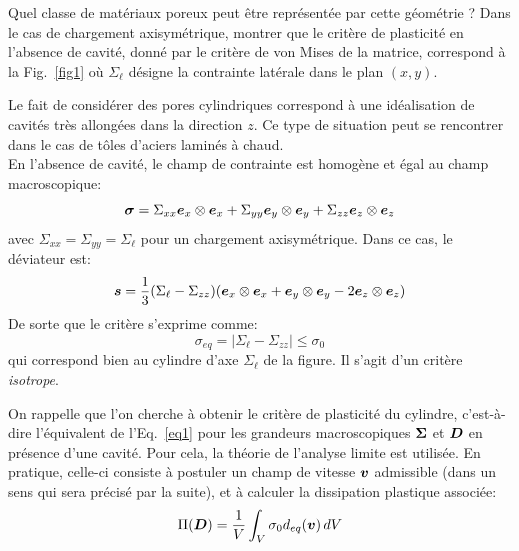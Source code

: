 \documentclass[french,12pt]{exam}
\begin{document}
\begin{questions}
\question Quel classe de matériaux poreux peut être représentée par cette géométrie ? Dans le cas de chargement axisymétrique, montrer que le critère de plasticité en l'absence de cavité, donné par le critère de von Mises de la matrice, correspond à la Fig.~\ref{fig1} où $\Sigma_\ell$ désigne la contrainte latérale dans le plan $(x,y)$.\\
\end{questions}

\begin{solution}
Le fait de considérer des pores cylindriques correspond à une idéalisation de cavités très allongées dans la direction $z$. Ce type de situation peut se rencontrer dans le cas de tôles d'aciers laminés à chaud.\\

En l'absence de cavité, le champ de contrainte est homogène et égal au champ macroscopique:
$$\boldsymbol{\sigma} = \Sigma_{xx}\boldsymbol{e}_x\otimes\boldsymbol{e}_x + \Sigma_{yy}\boldsymbol{e}_y\otimes\boldsymbol{e}_y +  \Sigma_{zz}\boldsymbol{e}_z\otimes\boldsymbol{e}_z$$
avec $\Sigma_{xx}=\Sigma_{yy}=\Sigma_\ell$ pour un chargement axisymétrique. Dans ce cas, le déviateur est:
$$\boldsymbol{s} = \dfrac{1}{3}(\Sigma_{\ell}-\Sigma_{zz})(\boldsymbol{e}_x\otimes\boldsymbol{e}_x + \boldsymbol{e}_y\otimes\boldsymbol{e}_y - 2\boldsymbol{e}_z\otimes\boldsymbol{e}_z)$$
De sorte que le critère s'exprime comme:
$$\sigma_{eq} = |\Sigma_\ell - \Sigma_{zz}| \leq \sigma_0$$
qui correspond bien au cylindre d'axe $\Sigma_{\ell}$ de la figure. Il s'agit d'un critère \textit{isotrope}.
\end{solution}

On rappelle que l'on cherche à obtenir le critère de plasticité du cylindre, c'est-à-dire l'équivalent de l'Eq.~\ref{eq1} pour les grandeurs macroscopiques $\boldsymbol{\Sigma}$ et $\boldsymbol{D}$ en présence d'une cavité. Pour cela, la théorie de l'analyse limite est utilisée. En pratique, celle-ci consiste à postuler un champ de vitesse $\boldsymbol{v}$ admissible (dans un sens qui sera précisé par la suite), et à calculer la dissipation plastique associée:
\begin{equation}
  \Pi(\boldsymbol{D}) = \frac{1}{V} \int_V \sigma_0 d_{eq}(\boldsymbol{v}) \,dV
  \label{eq3}
\end{equation}
\end{document}
